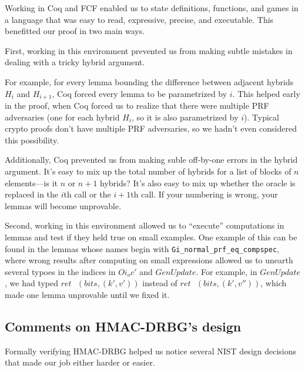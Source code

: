 \documentclass[12pt,lot, lof]{puthesis}
\newcommand{\s} {\textrm{ }}
\newcommand{\li} {\lstinline}
\begin{document}
{Working in Coq and FCF enabled us to state definitions, functions, and games in a language that was easy to read, expressive, precise, and executable. This benefitted our proof in two main ways. 

First, working in this environment prevented us from making subtle mistakes in dealing with a tricky hybrid argument.

For example, for every lemma bounding the difference between adjacent hybrids $H_i$ and $H_{i+1}$, Coq forced every lemma to be parametrized by $i$. This helped early in the proof, when Coq forced us to realize that there were multiple PRF adversaries (one for each hybrid $H_i$, so it is also parametrized by $i$). Typical crypto proofs don't have multiple PRF adversaries, so we hadn't even considered this possibility.

Additionally, Coq prevented us from making suble off-by-one errors in the hybrid argument. It's easy to mix up the total number of hybrids for a list of blocks of $n$ elements---is it $n$ or $n+1$ hybrids? It's also easy to mix up whether the oracle is replaced in the $i$th call or the $i+1$th call. If your numbering is wrong, your lemmas will become unprovable.


Second, working in this environment allowed us to ``execute'' computations in lemmas and test if they held true on small examples. One example of this can be found in the lemmas whose names begin with \li|Gi_normal_prf_eq_compspec|, where wrong results after computing on small expressions allowed us to unearth several typoes in the indices in $Oi_oc'$ and $GenUpdate$. For example, in $GenUpdate$, we had typed $ret \s (bits, (k', v'))$ instead of $ret \s (bits, (k', v''))$, which made one lemma unprovable until we fixed it.

\subsection{Comments on HMAC-DRBG's design} \label{sec:comments_on_hmac_drbgs_design}

Formally verifying HMAC-DRBG helped us notice several NIST design decisions that made our job either harder or easier.

}
\end{document}
